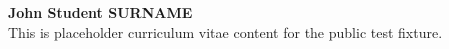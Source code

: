 \textbf{John Student SURNAME}\\
This is placeholder curriculum vitae content for the public test fixture.
